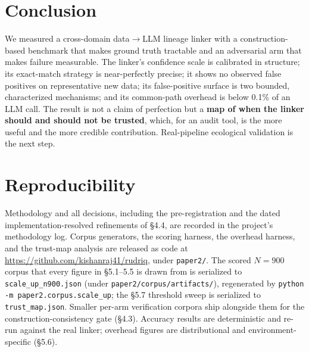 \documentclass[11pt]{article}
\newcommand{\dto}{\ensuremath{\rightarrow}}     %
\begin{document}
\section{Conclusion}

We measured a cross-domain data\dto{}LLM lineage linker with a construction-based benchmark that makes ground
truth tractable and an adversarial arm that makes failure measurable. The linker's confidence scale is
calibrated in structure; its exact-match strategy is near-perfectly precise; it shows no observed false
positives on representative new data; its false-positive surface is two bounded, characterized mechanisms;
and its common-path overhead is below 0.1\% of an LLM call. The result is not a claim of perfection but a
\textbf{map of when the linker should and should not be trusted}, which, for an audit tool, is the more
useful and the more credible contribution. Real-pipeline ecological validation is the next step.

\section*{Reproducibility}

Methodology and all decisions, including the pre-registration and the dated implementation-resolved
refinements of \S4.4, are recorded in the project's methodology log. Corpus generators, the scoring
harness, the overhead harness, and the trust-map analysis are released as code at
\url{https://github.com/kishanraj41/rudriq}, under \texttt{paper2/}. The scored $N=900$ corpus that
every figure in \S5.1--5.5 is drawn from is serialized to \texttt{scale\_up\_n900.json} (under
\texttt{paper2/corpus/artifacts/}), regenerated by \texttt{python -m paper2.corpus.scale\_up}; the
\S5.7 threshold sweep is serialized to \texttt{trust\_map.json}. Smaller per-arm verification corpora
ship alongside them for the construction-consistency gate (\S4.3). Accuracy results are deterministic
and re-run against the real linker; overhead figures are distributional and environment-specific (\S5.6).



\end{document}
